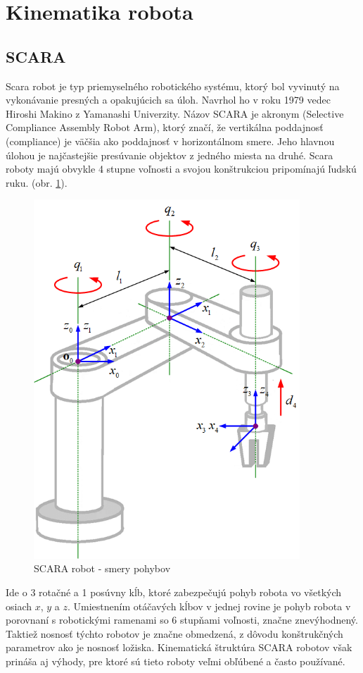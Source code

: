 
\section{Kinematika robota}
\label{kap:1}

\subsection{SCARA}
\label{kap:1.1}

Scara robot je typ priemyselného robotického systému, ktorý bol vyvinutý na vykonávanie presných a opakujúcich sa úloh. Navrhol ho v roku 1979 vedec Hiroshi Makino z Yamanashi Univerzity\cite{SCARA-uvod}. Názov SCARA je akronym (Selective Compliance Assembly Robot Arm), ktorý značí, že vertikálna poddajnosť (compliance) je väčšia ako poddajnosť v horizontálnom smere. Jeho hlavnou úlohou je najčastejšie presúvanie objektov z jedného miesta na druhé. Scara roboty majú obvykle 4 stupne voľnosti a svojou konštrukciou pripomínajú ľudskú ruku. (obr. \ref{OBRAZOK 1.1}).
\begin{figure}[h]
	\centering
	\includegraphics[width=100mm]{img/SCARA-robot-manipulator.png}
	\caption{SCARA robot - smery pohybov\cite{SCARA-struktura}}\label{OBRAZOK 1.1} 
\end{figure} 
Ide o 3 rotačné a 1 posúvny kĺb, ktoré zabezpečujú pohyb robota vo všetkých osiach $x$, $y$ a $z$. Umiestnením otáčavých kĺbov v jednej rovine je pohyb robota v porovnaní s robotickými ramenami so 6 stupňami voľnosti, značne znevýhodnený. Taktiež nosnosť týchto robotov je značne obmedzená, z dôvodu konštrukčných parametrov ako je nosnosť ložiska. Kinematická štruktúra SCARA robotov však prináša aj výhody, pre ktoré sú tieto roboty veľmi obľúbené a často používané.

